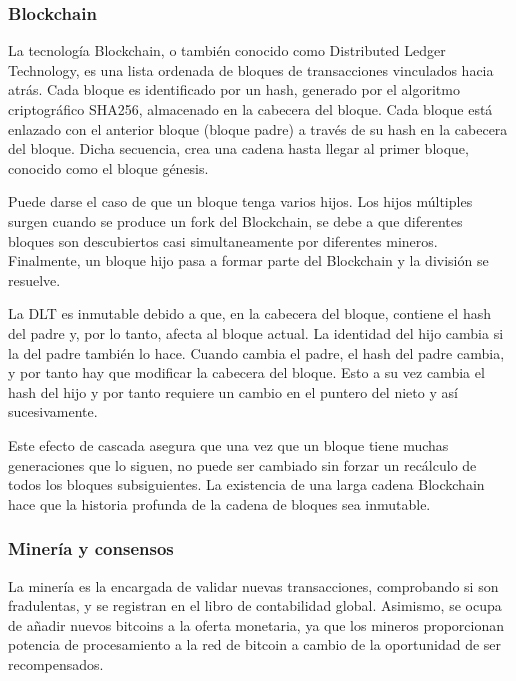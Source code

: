 \subsubsection{Blockchain}

La tecnología Blockchain, o también conocido como Distributed Ledger Technology, es una lista ordenada de bloques de 
transacciones vinculados hacia atrás. Cada bloque es identificado por un hash, generado por el algoritmo criptográfico 
SHA256, almacenado en la cabecera del bloque. Cada bloque está enlazado con el anterior bloque (bloque padre) a través 
de su hash en la cabecera del bloque. Dicha secuencia, crea una cadena hasta llegar al primer bloque, conocido como 
el bloque génesis.

\vspace{5mm}

\noindent Puede darse el caso de que un bloque tenga varios hijos. Los hijos múltiples surgen cuando se produce un fork 
del Blockchain, se debe a que diferentes bloques son descubiertos casi simultaneamente por diferentes mineros. 
Finalmente, un bloque hijo pasa a formar parte del Blockchain y la división se resuelve. 

\vspace{5mm}

\noindent La DLT es inmutable debido a que, en la cabecera del bloque, contiene el hash del padre y, por lo tanto, 
afecta al bloque actual. La identidad del hijo cambia si la del padre también lo hace. Cuando cambia el padre, el 
hash del padre cambia, y por tanto hay que modificar la cabecera del bloque. Esto a su vez cambia el hash del hijo y 
por tanto requiere un cambio en el puntero del nieto y así sucesivamente.

\vspace{5mm}

\noindent Este efecto de cascada asegura que una vez que un bloque tiene muchas generaciones que lo siguen, no puede 
ser cambiado sin forzar un recálculo de todos los bloques subsiguientes. La existencia de una larga cadena Blockchain 
hace que la historia profunda de la cadena de bloques sea inmutable.

\subsubsection{Minería y consensos}

La minería es la encargada de validar nuevas transacciones, comprobando si son fradulentas, y se registran en el 
libro de contabilidad global. Asimismo, se ocupa de añadir nuevos bitcoins a la oferta monetaria, ya que los 
mineros proporcionan potencia de procesamiento a la red de bitcoin a cambio de la oportunidad de ser recompensados.

